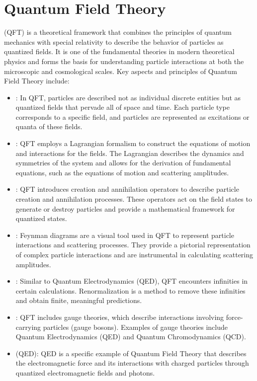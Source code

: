 \chapter{Quantum Field Theory}
\thispagestyle{fancy}

 (QFT) is a theoretical framework that combines the principles of quantum mechanics with special relativity to describe the behavior of particles as quantized fields. It is one of the fundamental theories in modern theoretical physics and forms the basis for understanding particle interactions at both the microscopic and cosmological scales. Key aspects and principles of Quantum Field Theory include:

\begin{itemize}
	\item {}: In QFT, particles are described not as individual discrete entities but as quantized fields that pervade all of space and time. Each particle type corresponds to a specific field, and particles are represented as excitations or quanta of these fields.

	\item {}: QFT employs a Lagrangian formalism to construct the equations of motion and interactions for the fields. The Lagrangian describes the dynamics and symmetries of the system and allows for the derivation of fundamental equations, such as the equations of motion and scattering amplitudes.

	\item {}: QFT introduces creation and annihilation operators to describe particle creation and annihilation processes. These operators act on the field states to generate or destroy particles and provide a mathematical framework for quantized states.

	\item {}: Feynman diagrams are a visual tool used in QFT to represent particle interactions and scattering processes. They provide a pictorial representation of complex particle interactions and are instrumental in calculating scattering amplitudes.

	\item {}: Similar to Quantum Electrodynamics (QED), QFT encounters infinities in certain calculations. Renormalization is a method to remove these infinities and obtain finite, meaningful predictions.

	\item {}: QFT includes gauge theories, which describe interactions involving force-carrying particles (gauge bosons). Examples of gauge theories include Quantum Electrodynamics (QED) and Quantum Chromodynamics (QCD).

	\item {} (QED): QED is a specific example of Quantum Field Theory that describes the electromagnetic force and its interactions with charged particles through quantized electromagnetic fields and photons.
\end{itemize}

